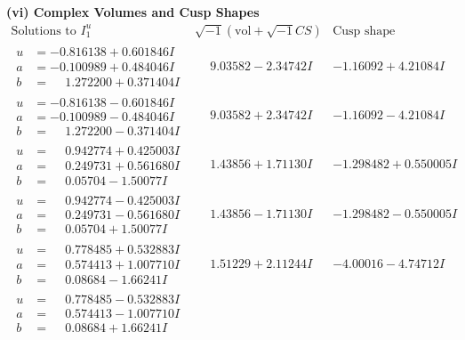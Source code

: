\documentclass[1p]{elsarticle_modified}
\theoremstyle{definition}
\newcommand{\I}{\sqrt{-1}}
\begin{document}
\newpage\flushleft \textbf{(vi) Complex Volumes and Cusp Shapes}
$$\begin{array}{c|c|c}  
\text{Solutions to }I^u_{1}& \I (\text{vol} + \sqrt{-1}CS) & \text{Cusp shape}\\
 \hline 
\begin{aligned}
u &= -0.816138 + 0.601846 I \\
a &= -0.100989 + 0.484046 I \\
b &= \phantom{-}1.272200 + 0.371404 I\end{aligned}
 & \phantom{-}9.03582 - 2.34742 I & -1.16092 + 4.21084 I \\ \hline\begin{aligned}
u &= -0.816138 - 0.601846 I \\
a &= -0.100989 - 0.484046 I \\
b &= \phantom{-}1.272200 - 0.371404 I\end{aligned}
 & \phantom{-}9.03582 + 2.34742 I & -1.16092 - 4.21084 I \\ \hline\begin{aligned}
u &= \phantom{-}0.942774 + 0.425003 I \\
a &= \phantom{-}0.249731 + 0.561680 I \\
b &= \phantom{-}0.05704 - 1.50077 I\end{aligned}
 & \phantom{-}1.43856 + 1.71130 I & -1.298482 + 0.550005 I \\ \hline\begin{aligned}
u &= \phantom{-}0.942774 - 0.425003 I \\
a &= \phantom{-}0.249731 - 0.561680 I \\
b &= \phantom{-}0.05704 + 1.50077 I\end{aligned}
 & \phantom{-}1.43856 - 1.71130 I & -1.298482 - 0.550005 I \\ \hline\begin{aligned}
u &= \phantom{-}0.778485 + 0.532883 I \\
a &= \phantom{-}0.574413 + 1.007710 I \\
b &= \phantom{-}0.08684 - 1.66241 I\end{aligned}
 & \phantom{-}1.51229 + 2.11244 I & -4.00016 - 4.74712 I \\ \hline\begin{aligned}
u &= \phantom{-}0.778485 - 0.532883 I \\
a &= \phantom{-}0.574413 - 1.007710 I \\
b &= \phantom{-}0.08684 + 1.66241 I\end{aligned}

\end{array}$$
\end{document}
